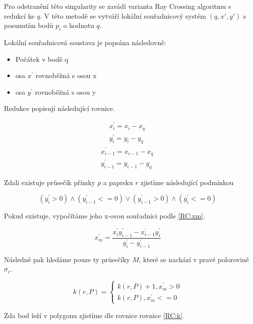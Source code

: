 \documentclass[11pt]{article}
\begin{document}
Pro odstranění této singularity se zavádí varianta Ray Crossing algoritmu s redukcí ke $q$. V této metodě se vytváří lokální souřadnicový systém $(q,x',y')$ s posunutím bodů ${p_{i}}$ o hodnotu $q$. 

Lokální souřadnicová soustava je popsána následovně:
\begin{itemize}
\item Počátek v bodě q
\item osa $x^{\prime}$ rovnoběžná s osou x
\item osa $y^{\prime}$ rovnoběžná s osou y
\end{itemize}

Redukce popisují následující rovnice.

\begin{eqnarray}
x_{i}^{\prime}=x_{i}-x_{q}\, \nonumber \\
y_{i}^{\prime}=y_{i}-y_{q} \
\end{eqnarray}
\begin{eqnarray}
x_{i-1}^{\prime}=x_{i-1}-x_{q}\, \nonumber \\
y_{i-1}^{\prime}=y_{i-1}-y_{q} \,
\end{eqnarray}

Zdali existuje průsečík přímky $p$ a paprsku $r$ zjistíme následující podmínkou

\begin{equation}
\left(y_{i}^{\prime}>0\right) \wedge\left(y_{i-1}^{\prime}<=0\right) \vee\left(y_{i-1}^{\prime}>0\right) \wedge\left(y_{i}^{\prime}<=0\right)
\end{equation}

Pokud existuje, vypočítáme jeho x-ovou souřadnici podle \ref{RC:xm}.

\begin{equation}
x_{m}^{\prime}=\frac{x_{i}^{\prime} y_{i-1}^{\prime}-x_{i-1}^{\prime} y_{i}^{\prime}}{y_{i}^{\prime}-y_{i-1}^{\prime}}
\label{RC:xm} 
\end{equation}

Následně pak hledáme pouze ty průsečíky $M$, které se nachází v pravé polorovině $\sigma_{r}$.

\begin{equation}
k(r, P)=\left\{\begin{array}{l}
k(r, P)+1, x_{m}^{\prime}>0 \\ 
k(r, P), x_{m}^{\prime} <= 0
\end{array}\right.
\end{equation}

Zda bod leží v polygonu zjistíme dle rovnice rovnice \ref{RC:k}.
\end{document}
